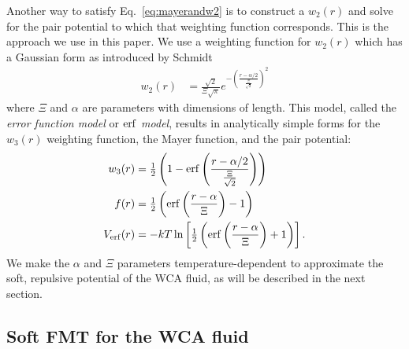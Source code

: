 \documentclass[letterpaper,twocolumn,amsmath,amssymb,prb]{revtex4-1}
\begin{document}
Another way to satisfy Eq.~\ref{eq:mayerandw2} is to 
construct a $w_2(r)$ and solve for 
the pair potential to which that weighting function corresponds.  
This is the approach we use in this paper. We use a weighting function 
for $w_2(r)$ which has a Gaussian form as introduced by Schmidt~\cite{schmidt2000fluid} 
\begin{align}
  w_2(r) &= \frac{\sqrt{2}}{\Xi \sqrt{\pi}} e^{-\left( \frac{r-\alpha/2}
  {\frac{\Xi}{\sqrt{2}}} \right)^2}
  \label{eq:gaussianw2}
\end{align}
where $\Xi$ and $\alpha$ are parameters with dimensions of length. 
This model, called the \emph{error function model} or \emph{$\mathrm{erf}$ model},
results in analytically simple forms 
for the $w_3(r)$ weighting function, the Mayer function, and the pair
potential:
\begin{align}
  w_3(r) &= \tfrac12 \left( 1 - \mathrm{erf}\left(\frac{r-\alpha/2}
  {\frac{\Xi}{\sqrt{2}}}\right) \right) \\
  f(r) &= \tfrac12 \left( \mathrm{erf}\left( \frac{r - \alpha}{\Xi} 
  \right) - 1 \right) \label{eq:mayer-approx} \\
  V_{\mathrm{erf}}(r) &= -kT\ln\left[\tfrac12 \left( \mathrm{erf}\left( \frac{r -
    \alpha}{\Xi} \right) + 1 \right) \right].\label{eq:Verf}
\end{align}
We make the $\alpha$ and $\Xi$ parameters temperature-dependent 
to approximate the soft, repulsive potential of the WCA fluid,
as will be described in the next section.

\subsection{Soft FMT for the WCA fluid}

\end{document}

